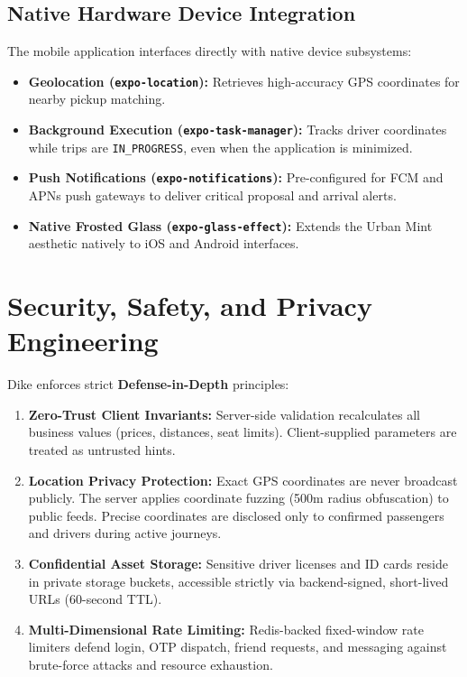\documentclass[conference,10pt,a4paper]{IEEEtran}
\begin{document}
\subsection{Native Hardware Device Integration}
The mobile application interfaces directly with native device subsystems:
\begin{itemize}
    \item \textbf{Geolocation (\texttt{expo-location}):} Retrieves high-accuracy GPS coordinates for nearby pickup matching.
    \item \textbf{Background Execution (\texttt{expo-task-manager}):} Tracks driver coordinates while trips are \texttt{IN\_PROGRESS}, even when the application is minimized.
    \item \textbf{Push Notifications (\texttt{expo-notifications}):} Pre-configured for FCM and APNs push gateways to deliver critical proposal and arrival alerts.
    \item \textbf{Native Frosted Glass (\texttt{expo-glass-effect}):} Extends the Urban Mint aesthetic natively to iOS and Android interfaces.
\end{itemize}

\section{Security, Safety, and Privacy Engineering}

Dike enforces strict \textbf{Defense-in-Depth} principles:
\begin{enumerate}
    \item \textbf{Zero-Trust Client Invariants:} Server-side validation recalculates all business values (prices, distances, seat limits). Client-supplied parameters are treated as untrusted hints.
    \item \textbf{Location Privacy Protection:} Exact GPS coordinates are never broadcast publicly. The server applies coordinate fuzzing (500m radius obfuscation) to public feeds. Precise coordinates are disclosed only to confirmed passengers and drivers during active journeys.
    \item \textbf{Confidential Asset Storage:} Sensitive driver licenses and ID cards reside in private storage buckets, accessible strictly via backend-signed, short-lived URLs (60-second TTL).
    \item \textbf{Multi-Dimensional Rate Limiting:} Redis-backed fixed-window rate limiters defend login, OTP dispatch, friend requests, and messaging against brute-force attacks and resource exhaustion.
\end{enumerate}
\end{document}
